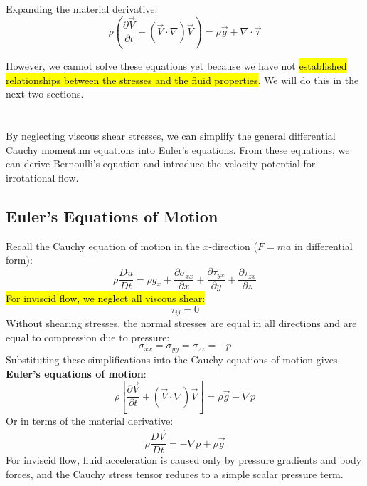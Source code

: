 ﻿\documentclass[12pt]{article}
\begin{document}
Expanding the material derivative:
\[
\rho\left(\frac{\partial\vec V}{\partial t}+(\vec V\cdot\nabla)\vec V\right)=\rho\vec g+\nabla\cdot\vec{\tau}
\]

However, we cannot solve these equations yet because we have not \hl{established relationships between the stresses and the fluid properties}. We will do this in the next two sections.
\section*{}
By neglecting viscous shear stresses, we can simplify the general differential Cauchy momentum equations into Euler's equations. From these equations, we can derive Bernoulli's equation and introduce the velocity potential for irrotational flow.
\subsection*{Euler's Equations of Motion}
Recall the Cauchy equation of motion in the $x$-direction ($F=ma$ in differential form):
\[
\rho\frac{Du}{Dt}=\rho g_x+\frac{\partial\sigma_{xx}}{\partial x}+\frac{\partial\tau_{yx}}{\partial y}+\frac{\partial\tau_{zx}}{\partial z}
\]
\hl{For inviscid flow, we neglect all viscous shear:}
\[
\tau_{ij}=0
\]
Without shearing stresses, the normal stresses are equal in all directions and are equal to compression due to pressure:
\[
\sigma_{xx}=\sigma_{yy}=\sigma_{zz}=-p
\]
Substituting these simplifications into the Cauchy equations of motion gives \textbf{Euler's equations of motion}:
\[
\boxed{\rho\left[\frac{\partial\vec V}{\partial t}+(\vec V\cdot\nabla)\vec V\right]}=\rho\vec g-\nabla p
\]
Or in terms of the material derivative:
\[
\boxed{\rho\frac{D\vec V}{Dt}=-\nabla p+\rho\vec g}
\]
For inviscid flow, fluid acceleration is caused only by pressure gradients and body forces, and the Cauchy stress tensor reduces to a simple scalar pressure term.
\end{document}
